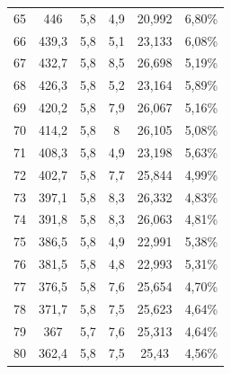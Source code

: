 \begin{longtable}{cccccc}
  65          & 446                  & 5,8           & 4,9            & 20,992        & 6,80\%                             \\
  66          & 439,3                & 5,8           & 5,1            & 23,133        & 6,08\%                             \\
  67          & 432,7                & 5,8           & 8,5            & 26,698        & 5,19\%                             \\
  68          & 426,3                & 5,8           & 5,2            & 23,164        & 5,89\%                             \\
  69          & 420,2                & 5,8           & 7,9            & 26,067        & 5,16\%                             \\
  70          & 414,2                & 5,8           & 8              & 26,105        & 5,08\%                             \\
  71          & 408,3                & 5,8           & 4,9            & 23,198        & 5,63\%                             \\
  72          & 402,7                & 5,8           & 7,7            & 25,844        & 4,99\%                             \\
  73          & 397,1                & 5,8           & 8,3            & 26,332        & 4,83\%                             \\
  74          & 391,8                & 5,8           & 8,3            & 26,063        & 4,81\%                             \\
  75          & 386,5                & 5,8           & 4,9            & 22,991        & 5,38\%                             \\
  76          & 381,5                & 5,8           & 4,8            & 22,993        & 5,31\%                             \\
  77          & 376,5                & 5,8           & 7,6            & 25,654        & 4,70\%                             \\
  78          & 371,7                & 5,8           & 7,5            & 25,623        & 4,64\%                             \\
  79          & 367                  & 5,7           & 7,6            & 25,313        & 4,64\%                             \\
  80          & 362,4                & 5,8           & 7,5            & 25,43         & 4,56\%                             \\

\end{longtable}
